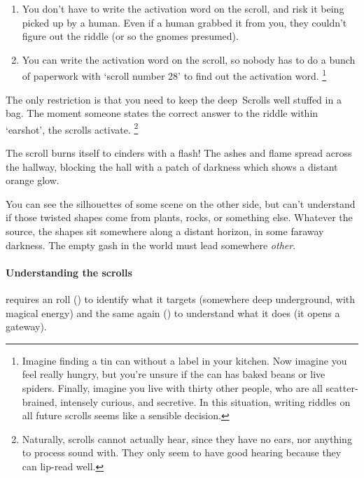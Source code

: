 \begin{multicols}{2}
\begin{enumerate}
  \item
  You don't have to write the activation word on the scroll, and risk it being picked up by a human.
  Even if a human grabbed it from you, they couldn't figure out the riddle (or so the gnomes presumed).
  \item
  You can write the activation word on the scroll, so nobody has to do a bunch of paperwork with `scroll number 28' to find out the activation word.%
  \footnote{Imagine finding a tin can without a label in your kitchen.
  Now imagine you feel really hungry, but you're unsure if the can has baked beans or live spiders.
  Finally, imagine you live with thirty other people, who are all scatter-brained, intensely curious, and secretive.
  In this situation, writing riddles on all future scrolls seems like a sensible decision.}
\end{enumerate}

The only restriction is that you need to keep the \Gls{deep}~Scrolls well stuffed in a bag.
The moment someone states the correct answer to the riddle within `earshot', the scrolls activate.%
\footnote{Naturally, scrolls cannot actually hear, since they have no ears, nor anything to process sound with.  They only seem to have good hearing because they can lip-read well.}

\labyrinthScroll

\showTalisman

\begin{boxtext}
  The scroll burns itself to cinders with a flash!
  The ashes and flame spread across the hallway, blocking the hall with a patch of darkness which shows a distant orange glow.

  You can see the silhouettes of some scene on the other side, but can't understand if those twisted shapes come from plants, rocks, or something else.
  Whatever the source, the shapes sit somewhere along a distant horizon, in some faraway darkness.
  The empty gash in the world must lead somewhere \emph{other}.
\end{boxtext}

\paragraph{Understanding the scrolls}
requires an  roll (\tn[12]) to identify what it targets (somewhere deep underground, with magical energy) and the same again (\tn[14]) to understand what it does (it opens a gateway).


\end{multicols}
